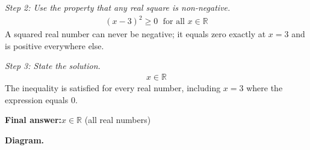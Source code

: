 \documentclass[11pt]{article}
\begin{document}
\textit{Step 2: Use the property that any real square is non-negative.}
\[\begin{gathered}
(x - 3)^2 \geq 0 \;\text{ for all } x \in \mathbb{R}
\end{gathered}\]
A squared real number can never be negative; it equals zero exactly at \( x = 3 \) and is positive everywhere else.

\textit{Step 3: State the solution.}
\[\begin{gathered}
x \in \mathbb{R}
\end{gathered}\]
The inequality is satisfied for every real number, including \( x = 3 \) where the expression equals 0.

\begin{answerbox}
\textbf{Final answer:}\quad \(\displaystyle x \in \mathbb{R}\) (all real numbers)
\end{answerbox}
\textbf{Diagram.}
\end{document}
